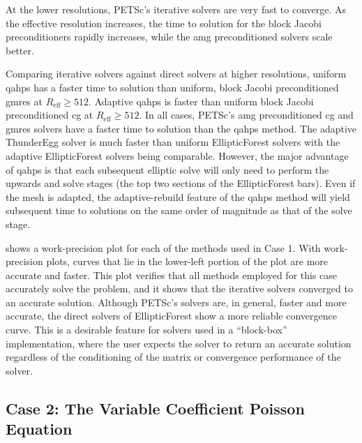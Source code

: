 At the lower resolutions, PETSc's iterative solvers are very fast to converge. As the effective resolution increases, the time to solution for the block Jacobi preconditioners rapidly increases, while the \gls{amg} preconditioned solvers scale better.

Comparing iterative solvers against direct solvers at higher resolutions, uniform \gls{qahps} has a faster time to solution than uniform, block Jacobi preconditioned \gls{gmres} at $R_{\text{eff}} \ge 512$. Adaptive \gls{qahps} is faster than uniform block Jacobi preconditioned \gls{cg} at $R_{\text{eff}} \ge 512$. In all cases, PETSc's \gls{amg} preconditioned \gls{cg} and \gls{gmres} solvers have a faster time to solution than the \gls{qahps} method. The adaptive ThunderEgg solver is much faster than uniform EllipticForest solvers with the adaptive EllipticForest solvers being comparable. However, the major advantage of \gls{qahps} is that each subsequent elliptic solve will only need to perform the upwards and solve stages (the top two sections of the EllipticForest bars). Even if the mesh is adapted, the adaptive-rebuild feature of the \gls{qahps} method will yield subsequent time to solutions on the same order of magnitude as that of the solve stage.

 shows a work-precision plot for each of the methods used in Case 1. With work-precision plots, curves that lie in the lower-left portion of the plot are more accurate and faster. This plot verifies that all methods employed for this case accurately solve the problem, and it shows that the iterative solvers converged to an accurate solution. Although PETSc's solvers are, in general, faster and more accurate, the direct solvers of EllipticForest show a more reliable convergence curve. This is a desirable feature for solvers used in a ``block-box'' implementation, where the user expects the solver to return an accurate solution regardless of the conditioning of the matrix or convergence performance of the solver.

\subsection{Case 2: The Variable Coefficient Poisson Equation}
\label{sub:case02}

